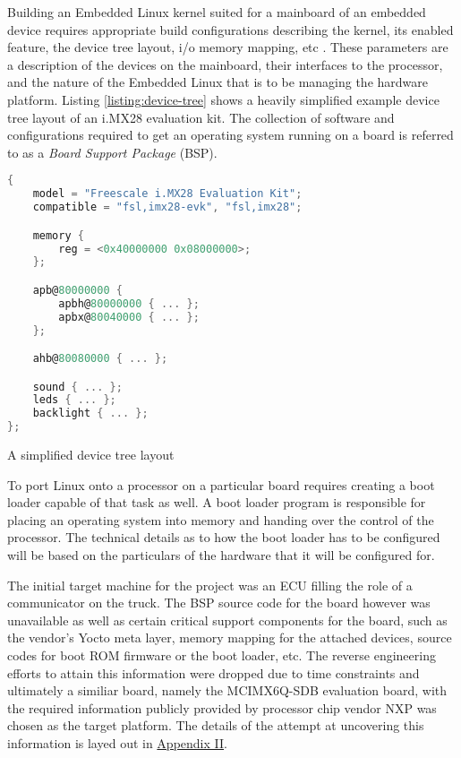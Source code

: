 Building an Embedded Linux kernel suited for a mainboard of an embedded device requires appropriate build configurations describing the kernel, its enabled feature, the device tree layout, i/o memory mapping, etc \cite{bootlin-port}. These parameters are a description of the devices on the mainboard, their interfaces to the processor, and the nature of the Embedded Linux that is to be managing the hardware platform. Listing \ref{listing:device-tree} shows a heavily simplified example device tree layout of an i.MX28 evaluation kit. The collection of software and configurations required to get an operating system running on a board is referred to as a \textit{Board Support Package} (BSP).

\begin{lstfloat}
\begin{lstlisting}[language=C]
{
	model = "Freescale i.MX28 Evaluation Kit";
	compatible = "fsl,imx28-evk", "fsl,imx28";

	memory {
		reg = <0x40000000 0x08000000>;
	};

	apb@80000000 {
		apbh@80000000 { ... };
		apbx@80040000 { ... };
	};

	ahb@80080000 { ... };

	sound { ... };
	leds { ... };
	backlight { ... };
};
\end{lstlisting}
\caption{A simplified device tree layout}
\label{listing:device-tree}
\end{lstfloat}


To port Linux onto a processor on a particular board requires creating a boot loader capable of that task as well. A boot loader program is responsible for placing an operating system into memory and handing over the control of the processor. The technical details as to how the boot loader has to be configured will be based on the particulars of the hardware that it will be configured for.

The initial target machine for the project was an ECU filling the role of a communicator on the truck. The BSP source code for the board however was unavailable as well as certain critical support components for the board, such as the vendor's Yocto meta layer, memory mapping for the attached devices, source codes for boot ROM firmware or the boot loader, etc. The reverse engineering efforts to attain this information were dropped due to time constraints and ultimately a similiar board, namely the MCIMX6Q-SDB evaluation board, with the required information publicly provided by processor chip vendor NXP was chosen as the target platform. The details of the attempt at uncovering this information is layed out in \hyperref[rtc-c300]{Appendix II}.

